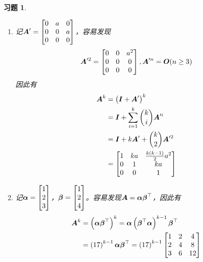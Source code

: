\documentclass{ctexart}
\newtheorem{problem}{习题}[section]
\begin{document}
\setcounter{problem}{21}
\begin{problem}\

\begin{enumerate}
    \item 记\(\boldsymbol{A}'=\begin{bmatrix}0&a&0\\0&0&a\\0&0&0\end{bmatrix}\)，容易发现
          \begin{equation*}
              \boldsymbol{A}'^2=\begin{bmatrix}0&0&a^2\\0&0&0\\0&0&0\end{bmatrix},\boldsymbol{A}'^n=\boldsymbol{O}(n\ge3)
          \end{equation*}
          因此有
          \begin{align*}
              \boldsymbol{A}^k & =\left( \boldsymbol{I}+\boldsymbol{A}' \right)^k                 \\
                      & =\boldsymbol{I}+\sum_{i=1}^k\binom{k}{i}\boldsymbol{A}'^i \\
                      & =\boldsymbol{I}+k\boldsymbol{A}'+\binom{k}{2}\boldsymbol{A}'^2     \\
                      & =\begin{bmatrix}
                             1 & ka & \frac{k(k-1)}{2}a^2 \\
                             0 & 1  & ka                  \\
                             0 & 0  & 1
                         \end{bmatrix}
          \end{align*}
    \item 记\(\boldsymbol{\alpha}=\begin{bmatrix}1\\2\\3\end{bmatrix}\)，\(\boldsymbol{\beta}=\begin{bmatrix}1\\2\\4\end{bmatrix}\)。容易发现\(\boldsymbol{A}=\boldsymbol{\alpha}\boldsymbol{\beta}^\top\)，因此有
          \begin{align*}
              \boldsymbol{A}^k & =\left( \boldsymbol{\alpha}\boldsymbol{\beta}^\top \right)^k=\boldsymbol{\alpha}\left( \boldsymbol{\beta}^\top\boldsymbol{\alpha} \right)^{k-1}\boldsymbol{\beta}^\top \\
                      & =\left( 17 \right)^{k-1}\boldsymbol{\alpha}\boldsymbol{\beta}^\top=\left( 17 \right)^{k-1}
              \begin{bmatrix}
                  1 & 2 & 4 \\2&4&8\\3&6&12
              \end{bmatrix}
          \end{align*}
\end{enumerate}

\end{problem}
\end{document}
